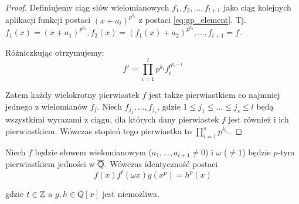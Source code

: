 \begin{proof}
Definiujemy ciąg słów wielomianowych $f_1, f_2, \ldots, f_{l+1}$ jako ciąg
kolejnych aplikacji funkcji postaci $(x+a_i)^{p^{k_i}}$ z postaci
\ref{eq:gp_element}. Tj. $f_1(x) = \left(x + a_1\right)^{p^{k_1}},
f_2(x) = \left(f_1(x) + a_2\right)^{p^{k_2}}, \ldots, f_{l+1} = f$.

Różniczkując otrzymujemy:
\[f' = \prod_{i=1}^l p^{k_i} f_i^{p^{k_i - 1}}\]

Zatem każdy wielokrotny pierwiastek $f$ jest także pierwiastkiem co najmniej
jednego z wielomianów $f_j$. Niech $f_{j_1}, \ldots, f_{j_s}$, gdzie $1 \leq j_1
\leq \ldots \leq j_s \leq l$ będą wszystkimi wyrazami z ciągu, dla których dany
pierwiastek $f$ jest również i ich pierwiastkiem. Wówczas stopień tego
pierwiastka to $\prod_{i=1}^s p^{k_{i_s}}$.
\end{proof}

\begin{lemma}
  Niech $f$ będzie słowem wielomianowym ($a_1, \ldots, a_{l+1} \neq 0$) i
  $\omega$ ($\neq 1$) będzie $p$-tym pierwiastkiem jedności w $\overline{\mathbb{Q}}$.
  Wówczas identyczność postaci
  \begin{equation}
    f(x)f^t(\omega x)g\left(x^p\right) = h^p(x)
    \label{eq:pol_lemma}
  \end{equation}

  gdzie $t \in \mathbb{Z}$ a $g, h \in \overline{Q}[x]$ jest niemożliwa.
  \label{lem:main_polynomial_lemma}
\end{lemma}

